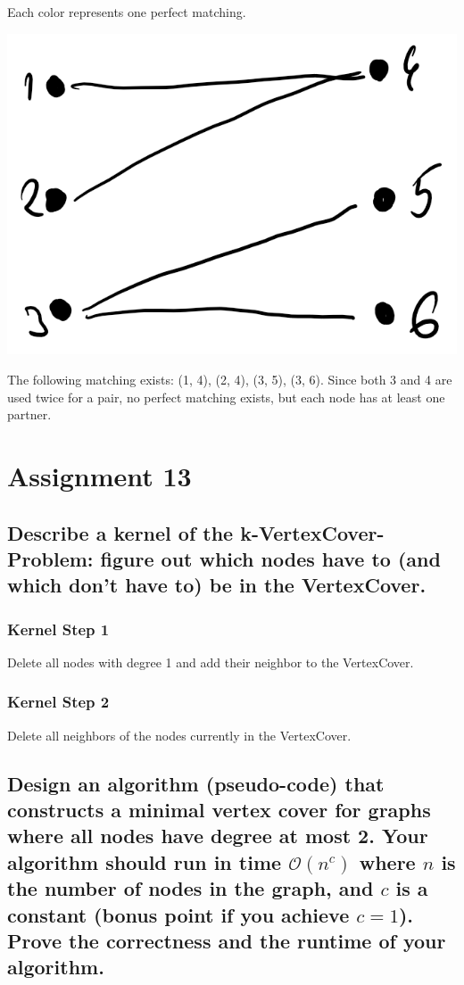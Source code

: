\documentclass[runningheads]{llncs}
\begin{document}
Each color represents one perfect matching.

\includegraphics[scale=0.5]{./resources/graph_4}

The following matching exists: (1, 4), (2, 4), (3, 5), (3, 6). Since both 3 and 4 are used twice for a pair, no perfect matching exists, but each node has at least one partner.

\section*{Assignment 13}

\subsection*{Describe a kernel of the k-VertexCover-Problem: figure out which nodes have to (and which don’t have to) be in the VertexCover.}

\subsubsection*{Kernel Step 1} Delete all nodes with degree 1 and add their neighbor to the VertexCover.

\subsubsection*{Kernel Step 2} Delete all neighbors of the nodes currently in the VertexCover.

\subsection*{Design an algorithm (pseudo-code) that constructs a minimal vertex cover for graphs where all nodes have degree at most 2. Your algorithm should run in time $\mathcal{O}(n^c)$ where $n$ is the number of nodes in the graph, and $c$ is a constant (bonus point if you achieve $c = 1$). Prove the correctness and the runtime of your algorithm.}
\end{document}
